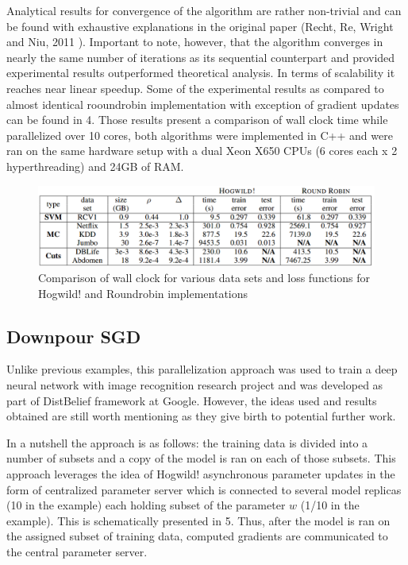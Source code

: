 Analytical results for convergence of the algorithm are rather non-trivial and can be found with exhaustive explanations in the original paper (Recht, Re, Wright and Niu, 2011 \cite{NIPS2011_4390}). Important to note, however, that the algorithm converges in nearly the same number of iterations as its sequential counterpart and provided experimental results outperformed theoretical analysis. In terms of scalability it reaches near linear speedup. Some of the experimental results as compared to almost identical rooundrobin implementation with exception of gradient updates can be found in \figurename{4}. Those results present a comparison of wall clock time while parallelized over 10 cores, both algorithms were implemented in C++ and were ran on the same hardware setup with a dual Xeon X650 CPUs (6 cores each x 2 hyperthreading) and 24GB of RAM.

\begin{figure}[h]
	\begin{center}
		\includegraphics[scale=0.25]{img/hogwild-res.png}
		\caption{Comparison of wall clock for various data sets and loss functions for Hogwild! and Roundrobin implementations}\label{4}
	\end{center}
\end{figure}


\subsection{Downpour SGD}
Unlike previous examples, this parallelization approach was used to train a deep neural network with image recognition research project \cite{NIPS2012_4687} and was developed as part of DistBelief framework at Google. However, the ideas used and results obtained are still worth mentioning as they give birth to potential further work. 

In a nutshell the approach is as follows: the training data is divided into a number of subsets and a copy of the model is ran on each of those subsets. This approach leverages the idea of Hogwild! asynchronous parameter updates in the form of centralized parameter server which is connected to several model replicas (10 in the example) each holding subset of the parameter $w$ (1/10 in the example). This is schematically presented in \figurename{5}. Thus, after the model is ran on the assigned subset of training data, computed gradients are communicated to the central parameter server.

